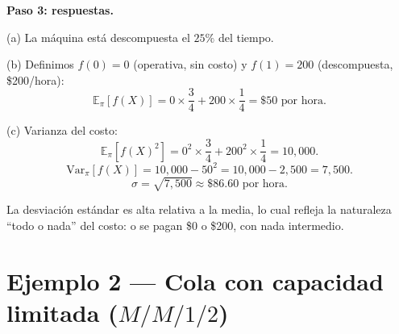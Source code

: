 \documentclass[11pt,a4paper]{article}
\theoremstyle{definition}
\theoremstyle{remark}
\newcommand{\E}{\mathbb{E}}
\newcommand{\Var}{\mathrm{Var}}
\begin{document}
\begin{ejemplo}
\textbf{Paso 3: respuestas.}

(a) La máquina está descompuesta el $25\%$ del tiempo.

(b) Definimos $f(0) = 0$ (operativa, sin costo) y $f(1) = 200$
(descompuesta, \$200/hora):
\[
  \E_\pi[f(X)] = 0 \times \frac{3}{4} + 200 \times \frac{1}{4}
  = \$50 \text{ por hora}.
\]

(c) Varianza del costo:
\[
  \E_\pi[f(X)^2] = 0^2 \times \frac{3}{4} + 200^2 \times \frac{1}{4}
  = 10{,}000.
\]
\[
  \Var_\pi[f(X)] = 10{,}000 - 50^2 = 10{,}000 - 2{,}500 = 7{,}500.
\]
\[
  \sigma = \sqrt{7{,}500} \approx \$86.60 \text{ por hora}.
\]

La desviación estándar es alta relativa a la media, lo cual refleja la
naturaleza ``todo o nada'' del costo: o se pagan \$0 o \$200, con nada
intermedio.
\end{ejemplo}

\section{Ejemplo 2 --- Cola con capacidad limitada ($M/M/1/2$)}
\end{document}
